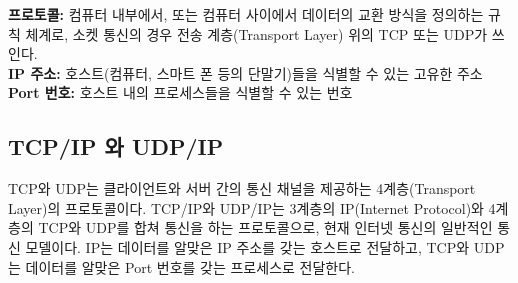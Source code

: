 \begin{multicols}{2}
    \textbf{프로토콜:} 컴퓨터 내부에서, 또는 컴퓨터 사이에서 데이터의 교환 방식을 정의하는 규칙 체계로, 소켓 통신의 경우 전송 계층(Transport Layer) 위의 TCP 또는 UDP가 쓰인다. \\
    \textbf{IP 주소:} 호스트(컴퓨터, 스마트 폰 등의 단말기)들을 식별할 수 있는 고유한 주소 \\
    \textbf{Port 번호:} 호스트 내의 프로세스들을 식별할 수 있는 번호 
    
\subsection{TCP/IP 와 UDP/IP}    
    TCP와 UDP는 클라이언트와 서버 간의 통신 채널을 제공하는 4계층(Transport Layer)의 프로토콜이다. TCP/IP와 UDP/IP는 3계층의 IP(Internet Protocol)와 4계층의 TCP와 UDP를 합쳐 통신을 하는 프로토콜으로, 현재 인터넷 통신의 일반적인 통신 모델이다. IP는 데이터를 알맞은 IP 주소를 갖는 호스트로 전달하고, TCP와 UDP는 데이터를 알맞은 Port 번호를 갖는 프로세스로 전달한다. 


\end{multicols}
